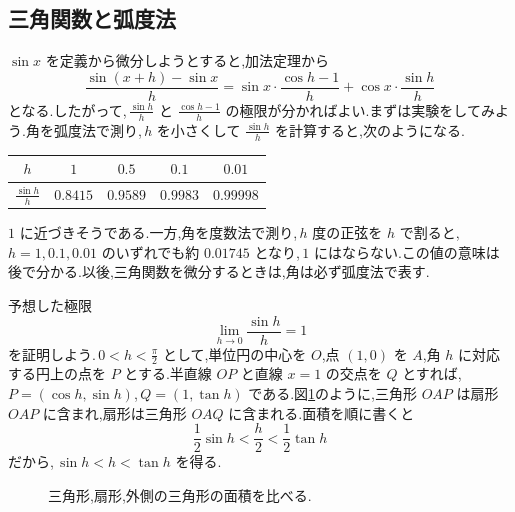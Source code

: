 \subsection{三角関数と弧度法}
$\sin x$ を定義から微分しようとすると,加法定理から
\[
 \frac{\sin(x+h)-\sin x}{h}
 =\sin x\cdot\frac{\cos h-1}{h}
   +\cos x\cdot\frac{\sin h}{h}
\]
となる.したがって,\,$\frac{\sin h}{h}$ と $\frac{\cos h-1}{h}$ の極限が分かればよい.まずは実験をしてみよう.角を弧度法で測り,\,$h$ を小さくして $\frac{\sin h}{h}$ を計算すると,次のようになる.
\begin{center}
\begin{tabular}{ccccc}
\toprule
$h$ & $1$ & $0.5$ & $0.1$ & $0.01$\\
\midrule
$\frac{\sin h}{h}$ & $0.8415$ & $0.9589$ & $0.9983$ & $0.99998$\\
\bottomrule
\end{tabular}
\end{center}
$1$ に近づきそうである.一方,角を度数法で測り,\,$h$ 度の正弦を $h$ で割ると,\,$h=1,0.1,0.01$ のいずれでも約 $0.01745$ となり,\,$1$ にはならない.この値の意味は後で分かる.以後,三角関数を微分するときは,角は必ず弧度法で表す.

予想した極限
\[
 \lim_{h\to0}\frac{\sin h}{h}=1
\]
を証明しよう.\,$0<h<\frac\pi2$ として,単位円の中心を $O$,点 $(1,0)$ を $A$,角 $h$ に対応する円上の点を $P$ とする.半直線 $OP$ と直線 $x=1$ の交点を $Q$ とすれば,\,$P=(\cos h,\sin h)$,\,$Q=(1,\tan h)$ である.図\ref{図:正弦の極限}のように,三角形 $OAP$ は扇形 $OAP$ に含まれ,扇形は三角形 $OAQ$ に含まれる.面積を順に書くと
\[
 \frac12\sin h<\frac h2<\frac12\tan h
\]
だから,\,$\sin h<h<\tan h$ を得る.

\begin{figure}[htbp]
\centering
{}
\caption{三角形,扇形,外側の三角形の面積を比べる.}
\label{図:正弦の極限}
\end{figure}

